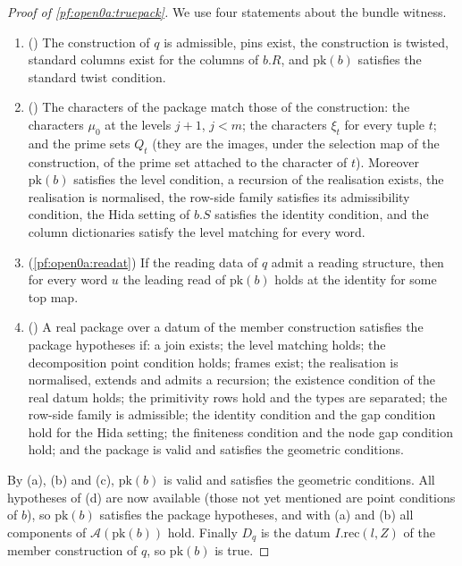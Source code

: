 \begin{proof}[Proof of \cref{pf:open0a:truepack}]
We use four statements about the bundle witness.
\begin{enumerate}[label=(\alph*)]
\item () The construction of $q$ is admissible, pins exist, the
construction is twisted, standard columns exist for the columns of $b.R$, and $\mathrm{pk}(b)$ satisfies the standard
twist condition.
\item () The characters of the package match those of the
construction: the characters $\mu_0$ at the levels $j+1$, $j<m$; the characters $\xi_t$ for every tuple $t$; and the
prime sets $Q_t$ (they are the images, under the selection map of the construction, of the prime set attached to the
character of $t$). Moreover $\mathrm{pk}(b)$ satisfies the level condition, a recursion of the realisation exists,
the realisation is normalised, the row-side family satisfies its admissibility condition, the Hida setting of $b.S$
satisfies the identity condition, and the column dictionaries satisfy the level matching for every word.
\item (\cref{pf:open0a:readat}) If the reading data of $q$ admit a reading structure, then for every word $u$ the
leading read of $\mathrm{pk}(b)$ holds at the identity for some top map.
\item () A real package over a datum of the member construction
satisfies the package hypotheses if: a join exists; the level matching holds; the decomposition point condition holds;
frames exist; the realisation is normalised, extends and admits a recursion; the existence condition of the real
datum holds; the primitivity rows hold and the types are separated; the row-side family is admissible; the identity
condition and the gap condition hold for the Hida setting; the finiteness condition and the node gap condition hold;
and the package is valid and satisfies the geometric conditions.
\end{enumerate}
By (a), (b) and (c), $\mathrm{pk}(b)$ is valid and satisfies the geometric conditions. All hypotheses of (d) are now
available (those not yet mentioned are point conditions of $b$), so $\mathrm{pk}(b)$ satisfies the package hypotheses,
and with (a) and (b) all components of $\mathcal A(\mathrm{pk}(b))$ hold. Finally $D_q$ is the datum
$I.\mathrm{rec}(l,Z)$ of the member construction of $q$, so $\mathrm{pk}(b)$ is true.
\end{proof}


